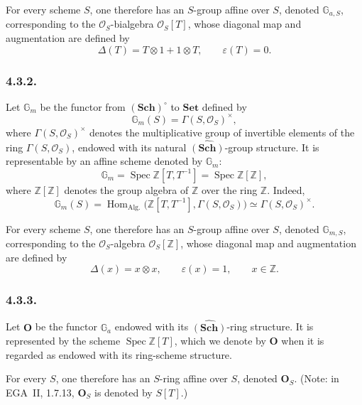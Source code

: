 For every scheme \(S\), one therefore has an \(S\)-group affine over
\(S\), denoted \(\mathbb G_{a,S}\), corresponding to the
\(\mathcal O_S\)-bialgebra \(\mathcal O_S[T]\), whose diagonal map and
augmentation are defined by
\[
  \Delta(T)=T\otimes1+1\otimes T,
  \qquad
  \varepsilon(T)=0.
\]

\subsubsection*{4.3.2.}

Let \(\mathbb G_m\) be the functor from \((\mathbf{Sch})^{\circ}\) to
\(\mathbf{Set}\) defined by
\[
  \mathbb G_m(S)=\Gamma(S,\mathcal O_S)^{\times},
\]
where \(\Gamma(S,\mathcal O_S)^{\times}\) denotes the multiplicative
group of invertible elements of the ring \(\Gamma(S,\mathcal O_S)\),
endowed with its natural \(\widehat{(\mathbf{Sch})}\)-group structure.
It is representable by an affine scheme denoted by \(\mathbb G_m\):
\[
  \mathbb G_m
    =\operatorname{Spec}\mathbb Z[T,T^{-1}]
    =\operatorname{Spec}\mathbb Z[\mathbb Z],
\]
where \(\mathbb Z[\mathbb Z]\) denotes the group algebra of \(\mathbb Z\)
over the ring \(\mathbb Z\). Indeed,
\[
  \mathbb G_m(S)
    =\operatorname{Hom}_{\mathrm{Alg.}}
       \bigl(\mathbb Z[T,T^{-1}],\Gamma(S,\mathcal O_S)\bigr)
    \simeq\Gamma(S,\mathcal O_S)^{\times}.
\]

For every scheme \(S\), one therefore has an \(S\)-group affine over
\(S\), denoted \(\mathbb G_{m,S}\), corresponding to the
\(\mathcal O_S\)-algebra \(\mathcal O_S[\mathbb Z]\), whose diagonal map
and augmentation are defined by
\[
  \Delta(x)=x\otimes x,
  \qquad
  \varepsilon(x)=1,
  \qquad x\in\mathbb Z.
\]

\subsubsection*{4.3.3.}

Let \(\mathbf O\) be the functor \(\mathbb G_a\) endowed with its
\(\widehat{(\mathbf{Sch})}\)-ring structure. It is represented by the
scheme \(\operatorname{Spec}\mathbb Z[T]\), which we denote by
\(\mathbf O\) when it is regarded as endowed with its ring-scheme
structure.

For every \(S\), one therefore has an \(S\)-ring affine over \(S\), denoted
\(\mathbf O_S\). (Note: in EGA~II,
1.7.13, \(\mathbf O_S\) is denoted by \(S[T]\).)

